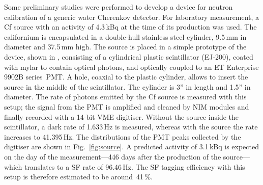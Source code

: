 Some preliminary studies were performed to develop a device for neutron calibration %
of a generic water Cherenkov detector.
For laboratory measurement, a Cf source with an activity of 4.3\,kBq at the time of its production was used.
The californium is encapsulated in a double-hull stainless steel cylinder, 9.5\,mm in diameter and 37.5\,mm high.
The source is placed in a simple prototype of the device, shown in , %
consisting of a cylindrical plastic scintillator (EJ-200), coated with mylar to contain optical photons, %
and optically coupled to an ET Enterprise 9902B series~PMT.
A hole, coaxial to the plastic cylinder, allows to insert the source in the middle of the scintillator.
The cylinder is 3'' in length and 1.5'' in diameter.
The rate of photons emitted by the Cf source is measured with this setup; %
the signal from the PMT is amplified and cleaned by NIM modules and finally recorded with a 14-bit VME digitiser.
Without the source inside the scintillator, a dark rate of 1.633\,Hz is measured, %
whereas with the source the rate increases to 41.395\,Hz.
The distributions of the PMT peaks collected by the digitiser are shown in Fig.~\ref{fig:source}.
A predicted activity of 3.1\,kBq is expected on the day of the measurement---446 days after the production of the source--- %
which translates to a SF rate of 96.46\,Hz.
The SF tagging efficiency with this setup is therefore estimated to be around~41\,\%.

